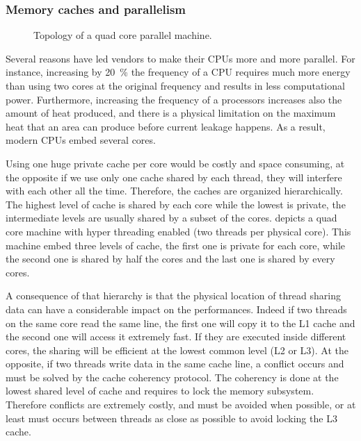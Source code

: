 \subsubsection{Memory caches and parallelism}

\begin{figure}[htb]
    \centering
    
    \caption{Topology of a quad core parallel machine.}
    \label{fig:topo-single}
\end{figure}

Several reasons have led vendors to make their \glspl{CPU} more and more parallel.
For instance, increasing by \SI{20}{\%} the frequency of a \gls{CPU} requires much more energy than using two cores at the original frequency and results in less computational power.
Furthermore, increasing the frequency of a processors increases also the amount of heat produced, and there is a physical limitation on the maximum heat that an area can produce before current leakage happens.
As a result, modern \glspl{CPU} embed several cores.

Using one huge private cache per core would be costly and space consuming, at the opposite if we use only one cache shared by each thread, they will interfere with each other all the time.
Therefore, the caches are organized hierarchically.
The highest level of cache is shared by each core while the lowest is private, the intermediate levels are usually shared by a subset of the cores.
 depicts a quad core machine with hyper threading enabled (two threads per physical core).
This machine embed three levels of cache, the first one is private for each core, while the second one is shared by half the cores and the last one is shared by every cores.

A consequence of that hierarchy is that the physical location of thread sharing data can have a considerable impact on the performances.
Indeed if two threads on the same core read the same line, the first one will copy it to the L1 cache and the second one will access it extremely fast.
If they are executed inside different cores, the sharing will be efficient at the lowest common level (L2 or L3).
At the opposite, if two threads write data in the same cache line, a conflict occurs and must be solved by the cache coherency protocol.
The coherency is done at the lowest shared level of cache and requires to lock the memory subsystem.
Therefore conflicts are extremely costly, and must be avoided when possible, or at least must occurs between threads as close as possible to avoid locking the L3 cache.


